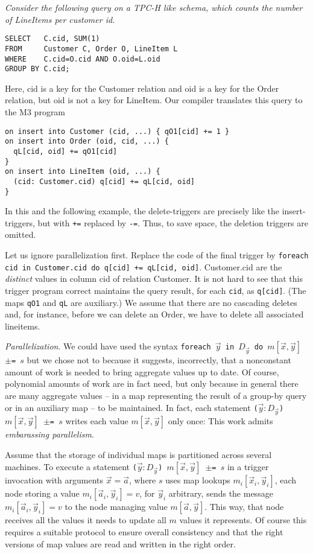 \begin{example}\em
\label{ex:TPCH-Q12}
Consider the following query on a TPC-H like schema,
which counts the number of LineItems per customer id.
\begin{verbatim}
SELECT   C.cid, SUM(1)
FROM     Customer C, Order O, LineItem L
WHERE    C.cid=O.cid AND O.oid=L.oid
GROUP BY C.cid;
\end{verbatim}
Here, cid is a key for the Customer relation and oid is a key for the
Order relation, but oid is not a key for LineItem.
Our compiler translates this query to the M3 program
\begin{verbatim}
on insert into Customer (cid, ...) { qO1[cid] += 1 }
on insert into Order (oid, cid, ...) {
  qL[cid, oid] += qO1[cid]
}
on insert into LineItem (oid, ...) {
  (cid: Customer.cid) q[cid] += qL[cid, oid]
}
\end{verbatim}

In this and the following example, the delete-triggers are precisely
like the insert-triggers, but with {\tt +=} replaced by {\tt -=}.
Thus, to save space, the deletion triggers are omitted.

Let us ignore parallelization first.
Replace the code of the final trigger by
{\tt foreach cid in Customer.cid do q[cid] += qL[cid, oid]}.
Customer.cid are the {\em distinct} values in column cid of relation Customer.
It is not hard to see that this trigger program correct maintains the
query result, for each {\tt cid}, as {\tt q[cid]}.
(The maps {\tt qO1} and {\tt qL} are auxiliary.)
We assume that
there are no cascading deletes and, for instance, before we can delete an
Order, we have to delete all associated lineitems.
\punto
\end{example}


{\em Parallelization}.
We could have used the syntax {\tt foreach $\vec{y}$ in $D_{\vec{y}}$ do
$m[\vec{x}, \vec{y}]$ $\pm$= $s$} but we chose not to because it suggests,
incorrectly, that a nonconstant amount of work is needed to bring aggregate
values up to date. Of course, polynomial amounts of work are in fact need,
but only because in general there are many aggregate values -- in a
map representing the result of a group-by query or in an auxiliary map --
to be maintained. In fact, each statement
{\tt ($\vec{y}: D_{\vec{y}}$) $m[\vec{x}, \vec{y}]$ $\pm$= $s$}
writes each value $m[\vec{x}, \vec{y}]$ only once: This work admits
{\em embarassing parallelism}.

Assume that the storage of individual maps
is partitioned across several machines. To execute a statement
{\tt ($\vec{y}: D_{\vec{y}}$) $m[\vec{x}, \vec{y}]$ $\pm$= $s$}
in a trigger invocation with arguments $\vec{x} = \vec{a}$,
where $s$ uses map lookups $m_i[\vec{x}_i, \vec{y}_i]$,
each node storing a value $m_i[\vec{a}_i, \vec{y}_i] = v$,
for $\vec{y}_i$ arbitrary, sends the message
$m_i[\vec{a}_i, \vec{y}_i] = v$ to the node managing value
$m[\vec{a}, \vec{y}]$. This way, that node receives all the values it
needs to update all $m$ values it represents.
Of course this requires a suitable protocol to ensure overall consistency
and that the right versions of map values are read and written in the right
order.



